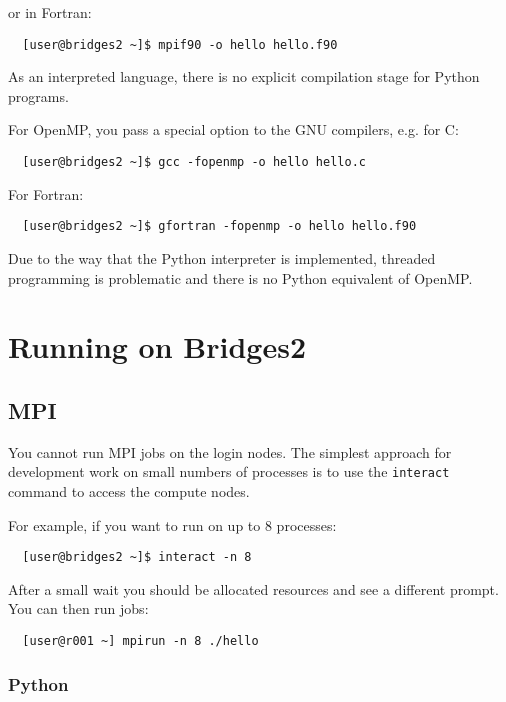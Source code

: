 \documentclass{article}
\begin{document}
or in Fortran:

\begin{verbatim}
  [user@bridges2 ~]$ mpif90 -o hello hello.f90
\end{verbatim}

As an interpreted language, there is no explicit compilation stage for
Python programs.

For OpenMP, you pass a special option to the GNU compilers, e.g. for C:

\begin{verbatim}
  [user@bridges2 ~]$ gcc -fopenmp -o hello hello.c
\end{verbatim}

For Fortran:

\begin{verbatim}
  [user@bridges2 ~]$ gfortran -fopenmp -o hello hello.f90
\end{verbatim}

Due to the way that the Python interpreter is implemented, threaded
programming is problematic and there is no Python equivalent of OpenMP.

\section{{\label{sec:running}}Running on Bridges2}

\subsection{MPI}

You cannot run MPI jobs on the login nodes. The simplest approach for
development work on small numbers of processes is to use the
\verb+interact+ command to access the compute nodes.

For example, if you want to run on up to 8 processes:

\begin{verbatim}
  [user@bridges2 ~]$ interact -n 8
\end{verbatim}
    
After a small wait you should be allocated resources and see a
different prompt. You can then run jobs:

\begin{verbatim}
  [user@r001 ~] mpirun -n 8 ./hello
\end{verbatim}

\subsubsection{Python}
\end{document}
